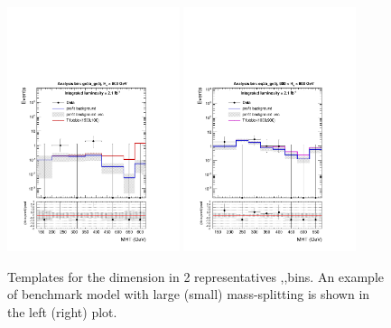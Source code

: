 \begin{figure}[tbhp]
    \caption{ Templates for the \mht dimension in 2 representatives \nj,\nb,\scalht bins. An example of benchmark model with large (small) mass-splitting is shown in the left (right) plot. \label{fig:mht-templates} }
  \begin{center}
    \includegraphics[width=0.45\textwidth]{postFitShape_ge3b_ge5j_800_Inf_prefit_uncompressed} \hspace{1cm}
    \includegraphics[width=0.45\textwidth]{postFitShape_eq2b_ge5j_600_800_prefit_compressed} \\
  \end{center}
\end{figure}


